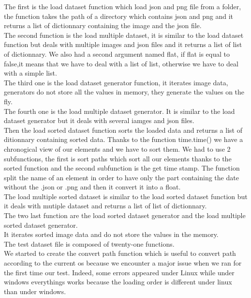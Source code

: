 \documentclass[12pt]{article}
\begin{document}
The first is the load dataset function which load json and png file from a folder, the function takes the path of a directory which contains json and png and it returns a list of dictionnary containing the image and the json file.\\

The second function is the load multiple dataset, it is similar to the load dataset function but deals with multiple images and json files and it returns a list of list of dictionnary.  We also had a second argument named flat, if flat is equal to false,it means that we have to deal with a list of list, otherwise we have to deal with a simple list.\\

The third one is the load dataset generator function, it iterates image data, generators do not store all the values in memory, they generate the values on the fly.\\

The fourth one is the load multiple dataset generator. It is similar to the load dataset generator but it deals with several iamges and json files.\\

Then the load sorted dataset function sorts the loaded data and returns a list of ditionnary containing sorted data. Thanks to the function time.time() we have a chronogical view of our elements and we have to sort them. We had to use 2 subfunctions, the first is sort paths which sort all our elements thanks to the sorted function and the second subfunction is the get time stamp. The function split the name of an element in order to have only the part containing the date without the .json or .png  and then it convert it into a float.\\


The load multiple sorted dataset is similar to the load sorted dataset function but it deals with mutiple dataset and returns a list of list of dictionnary.\\

The two last function are the load sorted dataset generator and the load multiple sorted dataset generator.\\
It iterates sorted image data and do not store the values in the memory.\\



The test dataset file is composed of twenty-one functions.\\

We started to create the convert path function which is useful to convert path according to the current os because we encounter a major issue when we ran for the first time our test. Indeed, some errors appeared under Linux while under windows everythings works because the loading order is different under linux than under windows.\\ \\
\end{document}
